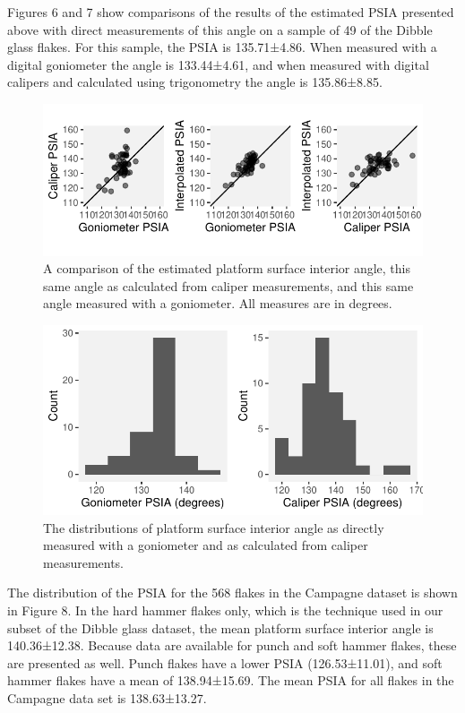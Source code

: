 \documentclass[10pt,letterpaper]{article}
\begin{document}
Figures 6 and 7 show comparisons of the results of the estimated PSIA
presented above with direct measurements of this angle on a sample of 49
of the Dibble glass flakes. For this sample, the PSIA is 135.71±4.86.
When measured with a digital goniometer the angle is 133.44±4.61, and
when measured with digital calipers and calculated using trigonometry
the angle is 135.86±8.85.

\begin{figure}
\centering
\includegraphics{PSIA_Manuscript_files/figure-latex/fig6_remeasure_comparisons-1.pdf}
\caption{A comparison of the estimated platform surface interior angle,
this same angle as calculated from caliper measurements, and this same
angle measured with a goniometer. All measures are in degrees.}
\end{figure}

\begin{figure}
\centering
\includegraphics{PSIA_Manuscript_files/figure-latex/fig7_remeasure_distributions-1.pdf}
\caption{The distributions of platform surface interior angle as
directly measured with a goniometer and as calculated from caliper
measurements.}
\end{figure}

The distribution of the PSIA for the 568 flakes in the Campagne dataset
is shown in Figure 8. In the hard hammer flakes only, which is the
technique used in our subset of the Dibble glass dataset, the mean
platform surface interior angle is 140.36±12.38. Because data are
available for punch and soft hammer flakes, these are presented as well.
Punch flakes have a lower PSIA (126.53±11.01), and soft hammer flakes
have a mean of 138.94±15.69. The mean PSIA for all flakes in the
Campagne data set is 138.63±13.27.
\end{document}
